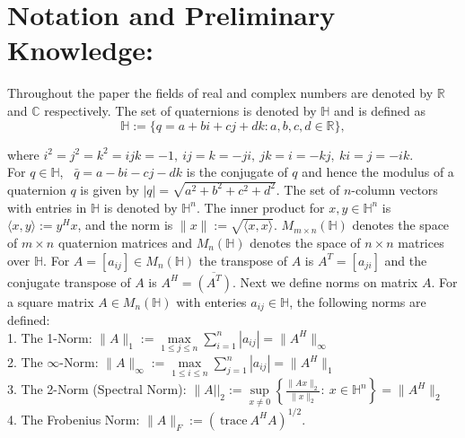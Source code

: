 \documentclass [12pt]{article}
\begin{document}
  \section{Notation and Preliminary Knowledge:}  Throughout the paper the fields of real and complex numbers are denoted by $\mathbb{R}$ and $\mathbb{C}$ respectively. The set of quaternions is denoted by $\mathbb{H}$ and is defined as $$\mathbb{H}:=\{q=a+bi+cj+dk:a, b, c, d \in\mathbb{R} \},$$  
	 
	\noindent where $i^2=j^2=k^2=ijk=-1,~ij=k=-ji,~jk=i=-kj,~ki=j=-ik.$\\
 For $q \in\mathbb{H}$,~ ${\bar{q}}=a-bi-cj-dk$ is the conjugate of $q$ and hence the modulus of a quaternion $q$ is given by $|q|=\sqrt{a^{2}+b^{2}+c^{2}+d^{2}}.$ The set of \(n\)-column vectors with entries in \(\mathbb{H}\) is denoted by \(\mathbb{H}^n\). The inner product for \(x, y \in \mathbb{H}^n\) is \(\langle x, y \rangle := y^H x\), and the norm is \(\|x\| := \sqrt{\langle x, x \rangle}\).
  ${M}_{m\times n}{(\mathbb{H})}$ denotes the space of ${m\times n}$ quaternion matrices and ${M}_{n}{(\mathbb{H})}$ denotes the space of ${n\times n}$ matrices over $\mathbb{H}.$ For $A=[a_{ij}] \in{M}_{n}{(\mathbb{H})}$ the transpose of $A$ is  \(A^T = [a_{ji}]\) and the conjugate transpose of $A$ is \(A^H = \overline{(A^T)}\).  Next we define norms on matrix $A.$
  For a square matrix $A\in M_{n}(\mathbb{H})$
  with enteries $a_{ij}\in\mathbb{H}$, the following norms are defined:\\ 
 1. The 1-Norm: $\|A\|_{1}:=\max\limits_{1\le j \le n}\sum\limits_{i=1}^{n}|a_{ij}|=\|A^{H}\|_{\infty}$\\   
 2. The $\infty$-Norm: $\|A\|_{\infty}:=\max\limits_{1\le i \le n}\sum\limits_{j=1}^{n}|a_{ij}|=\|A^{H}\|_{1}$\\
 3. The 2-Norm (Spectral Norm): $\|A||_{2}:=\sup\limits_{x\neq 0}\left\{ \frac{\|Ax\|_{2}}{\|x\|_{2}}:~x\in\mathbb{H}^{n}                         \right\} =\|A^{H}\|_{2}$\\
 4. The Frobenius Norm: $\|A\|_{F}:={(~\mbox{trace}~   A^{H}A)}^{1/2}.$\\ 
 
\end{document}
